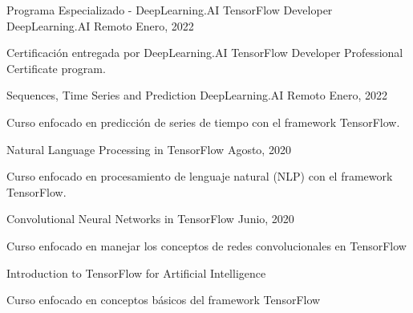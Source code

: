 

\begin{cventries}
  \cventry
    {Programa Especializado - DeepLearning.AI TensorFlow Developer} %
    {DeepLearning.AI} %
    {Remoto} %
    {Enero, 2022} %
    {
      \begin{cvitems} %
        \item {Certificación entregada por DeepLearning.AI TensorFlow Developer Professional Certificate program.}
      \end{cvitems}
    }
  \cventry
    {Sequences, Time Series and Prediction} %
    {DeepLearning.AI} %
    {Remoto} %
    {Enero, 2022} %
    {
      \begin{cvitems} %
        \item {Curso enfocado en predicción de series de tiempo con el framework TensorFlow.}
      \end{cvitems}
    }
  \cventry
    {Natural Language Processing in TensorFlow} %
    {} %
    {} %
    {Agosto, 2020} %
    {
      \begin{cvitems} %
        \item {Curso enfocado en procesamiento de lenguaje natural (NLP) con el framework TensorFlow.}
      \end{cvitems}
    }

\cventry
{Convolutional Neural Networks in TensorFlow} %
{} %
{} %
{Junio, 2020} %
{
  \begin{cvitems} %
    \item {Curso enfocado en manejar los conceptos de redes convolucionales en TensorFlow}
  \end{cvitems}
}

\cventry
{Introduction to TensorFlow for Artificial Intelligence} %
{} %
{} %
{} %
{
  \begin{cvitems} %
    \item {Curso enfocado en conceptos básicos del framework TensorFlow}
  \end{cvitems}
}

\end{cventries}